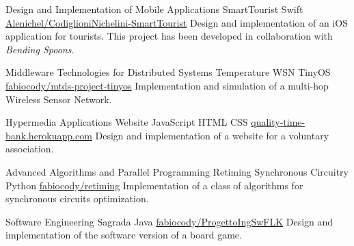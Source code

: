 

\begin{cventries}

\cventry
    {Design and Implementation of Mobile Applications}
    {SmartTourist}
    {Swift}
    {\href{https://github.com/Alenichel/CodiglioniNichelini-SmartTourist}{\faGithub\acvHeaderIconSep Alenichel/CodiglioniNichelini-SmartTourist}}
    {Design and implementation of an iOS application for tourists. This project has been developed in collaboration with \textit{Bending Spoons}.}
    
\cventry
    {Middleware Technologies for Distributed Systems}
    {Temperature WSN}
    {TinyOS}
    {\href{https://github.com/fabiocody/mtds-project-tinyos}{\faGithub\acvHeaderIconSep fabiocody/mtds-project-tinyos}}
    {Implementation and simulation of a multi-hop Wireless Sensor Network.}
    
\cventry
    {Hypermedia Applications}
    {Website}
    {JavaScript {\enskip\cdotp\enskip} HTML {\enskip\cdotp\enskip} CSS}
    {\href{https://quality-time-bank.herokuapp.com}{\faGlobe\acvHeaderIconSep quality-time-bank.herokuapp.com}}
    {Design and implementation of a website for a voluntary association.}
    
\cventry
    {Advanced Algorithms and Parallel Programming}
    {Retiming Synchronous Circuitry}
    {Python}
    {\href{https://github.com/fabiocody/retiming}{\faGithub\acvHeaderIconSep fabiocody/retiming}}
    {Implementation of a class of algorithms for synchronous circuits optimization.}
    
    
\cventry
    {Software Engineering}
    {Sagrada}
    {Java}
    {\href{https://github.com/fabiocody/ProgettoIngSwFLK}{\faGithub\acvHeaderIconSep fabiocody/ProgettoIngSwFLK}}
    {Design and implementation of the software version of a board game.}
\end{cventries}
